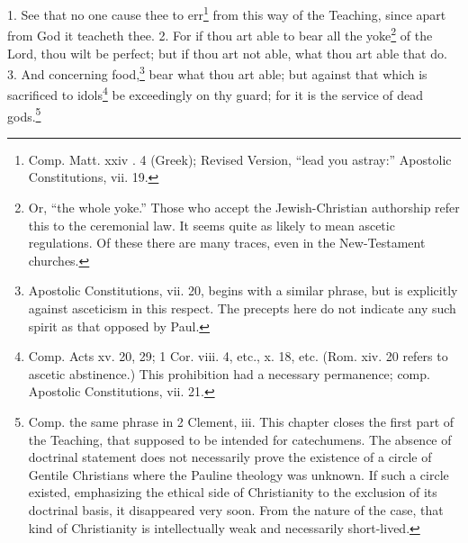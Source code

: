 1. See that no one cause thee to err\footnote{\par  Comp. Matt. xxiv . 4 (Greek); Revised Version, “lead you astray:” Apostolic Constitutions, vii. 19.} from this way of the Teaching, since apart from God it teacheth thee. 2. For if thou art able to bear all the yoke\footnote{\par  Or, “the whole yoke.” Those who accept the Jewish-Christian authorship refer this to the ceremonial law. It seems quite as likely to mean ascetic regulations. Of these there are many traces, even in the New-Testament churches.} of the Lord, thou wilt be perfect; but if thou art not able, what thou art able that do. 3. And concerning food,\footnote{\par  Apostolic Constitutions, vii. 20, begins with a similar phrase, but is explicitly against asceticism in this respect. The precepts here do not indicate any such spirit as that opposed by Paul.} bear what thou art able; but against that which is sacrificed to idols\footnote{\par  Comp. Acts xv. 20, 29; 1 Cor. viii. 4, etc., x. 18, etc. (Rom. xiv. 20 refers to ascetic abstinence.) This prohibition had a necessary permanence; comp. Apostolic Constitutions, vii. 21.} be exceedingly on thy guard; for it is the service of dead gods.\footnote{\par  Comp. the same phrase in 2 Clement, iii. This chapter closes the first part of the Teaching, that supposed to be intended for catechumens. The absence of doctrinal statement does not necessarily prove the existence of a circle of Gentile Christians where the Pauline theology was unknown. If such a circle existed, emphasizing the ethical side of Christianity to the exclusion of its doctrinal basis, it disappeared very soon. From the nature of the case, that kind of Christianity is intellectually weak and necessarily short-lived.}



